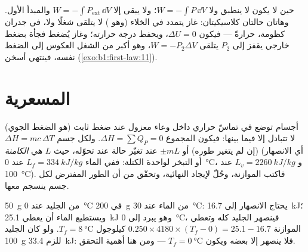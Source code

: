 \begin{remark}\label{rem:b1:first-law:irreversible}
حين لا يكون  لا ينطبق  ولا $W =
-\int P\,\dd V$؛ ولا يبقى إلا $W = -\int P_{\mathrm{ext}}\,\dd V$ والمبدأ
الأول. وهاتان حالتان كلاسيكيتان: غاز يتمدد في الخلاء (وهو ) لا يتلقى شغلًا ولا، في جدران كظومة، حرارةً --- فيكون $\Delta U
= 0$، ويحفظ  درجة حرارته؛ وغاز يُضغط فجأة
بضغط خارجي يقفز إلى $P_2$ يتلقى $W = -P_2\Delta V$، وهو أكبر
من الشغل العكوس إلى الضغط نفسه، فينتهي أسخن
(\cref{exo:b1:first-law:11}).
\end{remark}

\section{المسعرية}

\begin{method}\label{met:b1:first-law:calorimetry}
أجسام توضع في تماسّ حراري داخل وعاء معزول عند ضغط ثابت
(هو الضغط الجوي) لا تتبادل  إلا فيما بينها: فيكون المجموع
$\Delta H = \sum Q_P = 0$. ولكل جسم $\Delta H = mc\,\Delta T$ (إن لم يتغير
طوره) أو $\pm mL$ عند تغيّر حالة عند  تحوّله،
حيث $L$ هي \emph{ الكامنة} (أي  الانصهار أو التبخر
لواحدة الكتلة: ففي الماء $L_f = \qty{334}{kJ/kg}$ عند \qty{0}{\degreeCelsius}، و $L_v =
\qty{2260}{kJ/kg}$ عند \qty{100}{\degreeCelsius}). فاكتب الموازنة، وحُلّ
لإيجاد  النهائية، وتحقّق من أن الطور المفترض لكل
جسم ينسجم معها.
\end{method}

\begin{example}\label{ex:b1:first-law:ice}
\qty{50}{g} من الجليد عند \qty{0}{\degreeCelsius} في \qty{200}{g} من الماء عند
\qty{30}{\degreeCelsius}: يحتاج الانصهار إلى \qty{16.7}{kJ}؛ ويستطيع الماء أن
يعطي \qty{25.1}{kJ} وهو يبرد إلى \qty{0}{\degreeCelsius}، فينصهر الجليد كله
وتعطي الموازنة $0.250 \times 4180 \times (T_f - 0) = 25.1 - 16.7$ كيلوجول
$T_f = \qty{8}{\degreeCelsius}$. ولو كان الجليد \qty{100}{g} للزم
\qty{33.4}{kJ}: فلا ينصهر إلا بعضه ويكون $T_f = \qty{0}{\degreeCelsius}$
--- ومن هنا أهمية التحقق.
\end{example}


